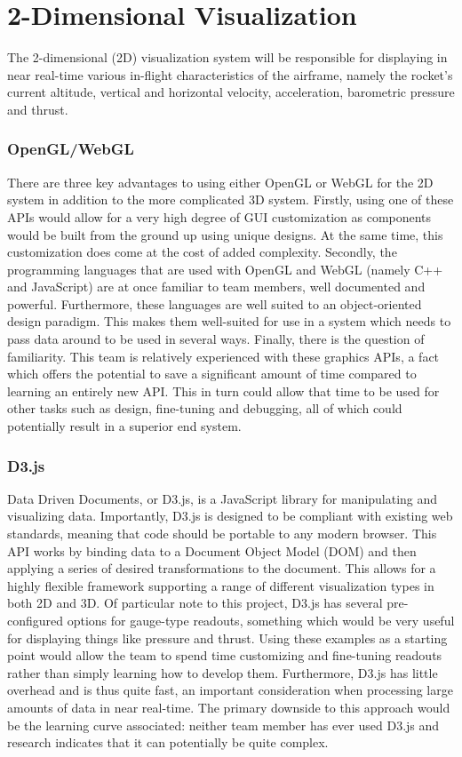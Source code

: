\documentclass[onecolumn, draftclsnofoot,10pt, compsoc]{IEEEtran}
\begin{document}
\section{2-Dimensional Visualization}
	The 2-dimensional (2D) visualization system will be responsible for displaying in near real-time various in-flight characteristics of the airframe, namely the rocket's current altitude, vertical and horizontal velocity, acceleration, barometric pressure and thrust.
	
	\subsubsection{OpenGL/WebGL}
		There are three key advantages to using either OpenGL or WebGL for the 2D system in addition to the more complicated 3D system.
		Firstly, using one of these APIs would allow for a very high degree of GUI customization as components would be built from the ground up using unique designs.
		At the same time, this customization does come at the cost of added complexity.
		Secondly, the programming languages that are used with OpenGL and WebGL (namely C++ and JavaScript) are at once familiar to team members, well documented and powerful.
		Furthermore, these languages are well suited to an object-oriented design paradigm.
		This makes them well-suited for use in a system which needs to pass data around to be used in several ways.
		Finally, there is the question of familiarity.
		This team is relatively experienced with these graphics APIs, a fact which offers the potential to save a significant amount of time compared to learning an entirely new API.
		This in turn could allow that time to be used for other tasks such as design, fine-tuning and debugging, all of which could potentially result in a superior end system.

	\subsubsection{D3.js}
		Data Driven Documents, or D3.js, is a JavaScript library for manipulating and visualizing data. \cite{d3js1}
		Importantly, D3.js is designed to be compliant with existing web standards, meaning that code should be portable to any modern browser.
		This API works by binding data to a Document Object Model (DOM) and then applying a series of desired transformations to the document. \cite{d3js1}
		This allows for a highly flexible framework supporting a range of different visualization types in both 2D and 3D.
		Of particular note to this project, D3.js has several pre-configured options for gauge-type readouts, something which would be very useful for displaying things like pressure and thrust.
		Using these examples as a starting point would allow the team to spend time customizing and fine-tuning readouts rather than simply learning how to develop them.
		Furthermore, D3.js has little overhead and is thus quite fast, an important consideration when processing large amounts of data in near real-time. \cite{d3js1}
		The primary downside to this approach would be the learning curve associated: neither team member has ever used D3.js and research indicates that it can potentially be quite complex.
		
\end{document}
